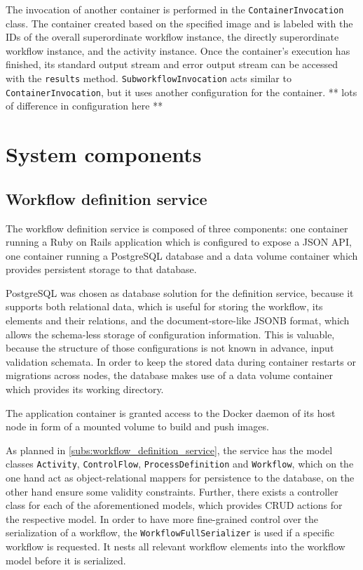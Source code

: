     The invocation of another container is performed in the \texttt{ContainerInvocation} class. The container created based on the specified image and is labeled with the \acp{ID} of the overall superordinate workflow instance, the directly superordinate workflow instance, and the activity instance.
    Once the container's execution has finished, its standard output stream and error output stream can be accessed with the \texttt{results} method. \texttt{SubworkflowInvocation} acts similar to \texttt{ContainerInvocation}, but it uses another configuration for the container. ** lots of difference in configuration here **


\section{System components} %
\label{sec:components_implementation}
  \subsection{Workflow definition service} %
    \label{sub:workflow_definition_service}

    The workflow definition service is composed of three components: one container running a Ruby on Rails application which is configured to expose a JSON API, one container running a PostgreSQL database and a data volume container which provides persistent storage to that database.

    PostgreSQL was chosen as database solution for the definition service, because it supports both relational data, which is useful for storing the workflow, its elements and their relations, and the document-store-like JSONB format, which allows the schema-less storage of configuration information.
    This is valuable, because the structure of those configurations is not known in advance, \eg input validation schemata.
    In order to keep the stored data during container restarts or migrations across nodes, the database makes use of a data volume container which provides its working directory.

    The application container is granted access to the Docker daemon of its host node in form of a mounted volume to build and push images.

    As planned in \ref{subs:workflow_definition_service}, the service has the model classes \texttt{Activity}, \texttt{ControlFlow}, \texttt{ProcessDefinition} and \texttt{Workflow}, which on the one hand act as object-relational mappers for persistence to the database, on the other hand ensure some validity constraints. Further, there exists a controller class for each of the aforementioned models, which provides \ac{CRUD} actions for the respective model. In order to have more fine-grained control over the serialization of a workflow, the \texttt{WorkflowFullSerializer} is used if a specific workflow is requested. It nests all relevant workflow elements into the workflow model before it is serialized.

